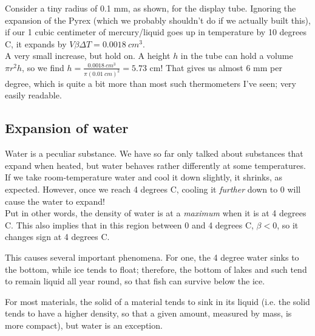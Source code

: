 Consider a tiny radius of 0.1 mm, as shown, for the display tube. Ignoring the expansion of the Pyrex (which we probably shouldn't do if we actually built this), if our 1 cubic centimeter of mercury/liquid goes up in temperature by 10 degrees C, it expands by $V \beta \Delta T = \SI{0.0018}{cm^3}$.\\
A very small increase, but hold on. A height $h$ in the tube can hold a volume $\pi r^2 h$, so we find $\displaystyle h = \frac{\SI{0.0018}{cm^3}}{\pi (\SI{0.01}{cm})^2} = 5.73$ cm! That gives us almost 6 mm per degree, which is quite a bit more than most such thermometers I've seen; very easily readable.

\subsection{Expansion of water}

Water is a peculiar substance. We have so far only talked about substances that expand when heated, but water behaves rather differently at some temperatures.\\
If we take room-temperature water and cool it down slightly, it shrinks, as expected. However, once we reach 4 degrees C, cooling it \emph{further} down to 0 will cause the water to expand!\\
Put in other words, the density of water is at a \emph{maximum} when it is at 4 degrees C. This also implies that in this region between 0 and 4 degrees C, $\beta < 0$, so it changes sign at 4 degrees C.

This causes several important phenomena. For one, the 4 degree water sinks to the bottom, while ice tends to float; therefore, the bottom of lakes and such tend to remain liquid all year round, so that fish can survive below the ice.

For most materials, the solid of a material tends to sink in its liquid (i.e. the solid tends to have a higher density, so that a given amount, measured by mass, is more compact), but water is an exception.
